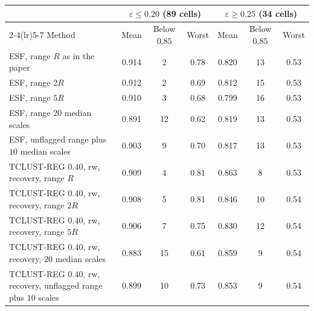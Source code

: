 \begin{tabular}{lcccccc}
\toprule
 & \multicolumn{3}{c}{$\varepsilon\le0.20$ (89 cells)} & \multicolumn{3}{c}{$\varepsilon\ge0.25$ (34 cells)} \\
\cmidrule(lr){2-4}\cmidrule(lr){5-7}
Method & Mean & Below $0.85$ & Worst & Mean & Below $0.85$ & Worst \\
\midrule
ESF, range $R$ as in the paper & 0.914 & 2 & 0.78 & 0.820 & 13 & 0.53 \\
ESF, range $2R$ & 0.912 & 2 & 0.69 & 0.812 & 15 & 0.53 \\
ESF, range $5R$ & 0.910 & 3 & 0.68 & 0.799 & 16 & 0.53 \\
ESF, range $20$ median scales & 0.891 & 12 & 0.62 & 0.819 & 13 & 0.53 \\
ESF, unflagged range plus $10$ median scales & 0.903 & 9 & 0.70 & 0.817 & 13 & 0.53 \\
TCLUST-REG $0.40$, rw, recovery, range $R$ & 0.909 & 4 & 0.81 & 0.863 & 8 & 0.53 \\
TCLUST-REG $0.40$, rw, recovery, range $2R$ & 0.908 & 5 & 0.81 & 0.846 & 10 & 0.54 \\
TCLUST-REG $0.40$, rw, recovery, range $5R$ & 0.906 & 7 & 0.75 & 0.830 & 12 & 0.54 \\
TCLUST-REG $0.40$, rw, recovery, $20$ median scales & 0.883 & 15 & 0.61 & 0.859 & 9 & 0.54 \\
TCLUST-REG $0.40$, rw, recovery, unflagged range plus $10$ scales & 0.899 & 10 & 0.73 & 0.853 & 9 & 0.54 \\
\bottomrule
\end{tabular}
